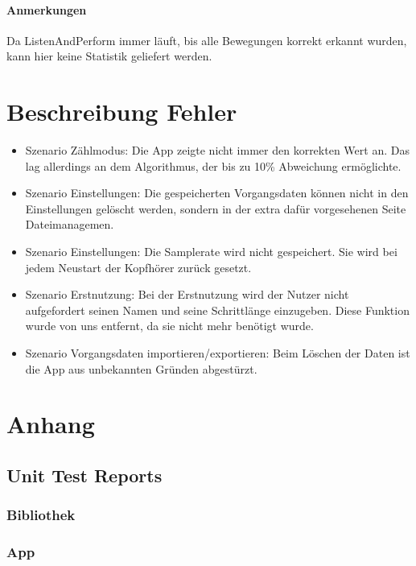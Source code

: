 \documentclass[a4paper,12pt]{article}
\begin{document}
\paragraph{Anmerkungen}
Da ListenAndPerform immer läuft, bis alle Bewegungen korrekt erkannt wurden, kann hier keine Statistik geliefert werden.


\section{Beschreibung Fehler}
\begin{itemize}
	\item[] \textsf{Szenario \glqq Zählmodus\grqq:} Die App zeigte nicht immer den korrekten Wert an.
										Das lag allerdings an dem Algorithmus, der bis zu 10\% Abweichung ermöglichte.
	\item[] \textsf{Szenario \glqq Einstellungen\grqq:} Die gespeicherten Vorgangsdaten können nicht in den Einstellungen gelöscht werden, sondern in der extra dafür vorgesehenen Seite \glqq Dateimanagemen\grqq.
	\item[] \textsf{Szenario \glqq Einstellungen\grqq:} Die Samplerate wird nicht gespeichert. Sie wird bei jedem Neustart der Kopfhörer zurück gesetzt.
	\item[] \textsf{Szenario \glqq Erstnutzung\grqq:} Bei der Erstnutzung wird der Nutzer nicht aufgefordert seinen Namen und seine Schrittlänge einzugeben.
	Diese Funktion wurde von uns entfernt, da sie nicht mehr benötigt wurde.
	\item[] \textsf{Szenario \glqq Vorgangsdaten importieren/exportieren\grqq:} Beim Löschen der Daten ist die App aus unbekannten Gründen abgestürzt.
\end{itemize}


\section{Anhang}
\subsection{Unit Test Reports}
\subsubsection{Bibliothek}
\subsubsection{App}
\end{document}
